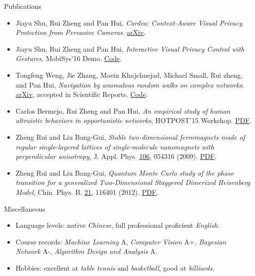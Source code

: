 \documentclass{resume} %
\begin{document}
\begin{rSection}{Publications}

\begin{itemize}[label=\raisebox{0.25ex}{\tiny\JackStarBold}]
\item Jiayu Shu, Rui Zheng and Pan Hui, \emph{Cardea: Context-Aware Visual Privacy Protection from Pervasive Cameras}. \href{https://arxiv.org/abs/1610.00889}{\textsf{arXiv}}.

\item Jiayu Shu, Rui Zheng and Pan Hui, \emph{Interactive Visual Privacy Control with Gestures}, \textsf{MobiSys'16 Demo}. \href{https://github.com/ZhengRui/mobisys16demo}{Code}.

\item Tongfeng Weng, Jie Zhang, Moein Khajehnejad, Michael Small, Rui zheng, and Pan Hui, \emph{Navigation by anomalous random walks on complex networks}. \href{https://arxiv.org/abs/1610.02878}{\textsf{arXiv}}, accepted in \textsf{Scientific Reports}. \href{https://github.com/ZhengRui/mean-first-passage}{Code}.

\item Carlos Bermejo, Rui Zheng and Pan Hui, \emph{An empirical study of human altruistic behaviors in opportunistic networks}, \textsf{HOTPOST'15 Workshop}. \href{http://bit.ly/2e9Icla}{PDF}.

\item Zheng Rui and Liu Bang-Gui, \emph{Stable two-dimensional ferromagnets made of regular single-layered lattices of single-molecule nanomagnets with perpendicular anisotropy}, \textsf{J. Appl. Phys.} \underline{106}, 054316 (2009). \href{http://bit.ly/29aBRQD}{PDF}.

\item Zheng Rui and Liu Bang-Gui, \emph{Quantum Monte Carlo study of the phase transition for a generalized Two-Dimensional Staggered Dimerized Heisenberg Model}, \textsf{Chin. Phys. B.} \underline{21}, 116401 (2012). \href{http://bit.ly/29aBDJb}{PDF}.
\end{itemize}

\end{rSection}

\begin{rSection}{Miscellaneous}
\begin{itemize}[label=\raisebox{0.25ex}{\tiny\JackStarBold}]
    \item Language levels: native {\it Chinese}, full professional proficient {\it English}.
    \item Course records: {\it Machine Learning} {\color{DarkOrchid} A}, {\it Computer Vision} {\color{DarkOrchid} A+}, {\it Bayesian Network} {\color{DarkOrchid} A-}, {\it Algorithm Design and Analysis} {\color{DarkOrchid} A}.
    \item Hobbies: excellent at {\it table tennis} and {\it basketball}, good at {\it billiards}.
\end{itemize}
\end{rSection}
\end{document}
